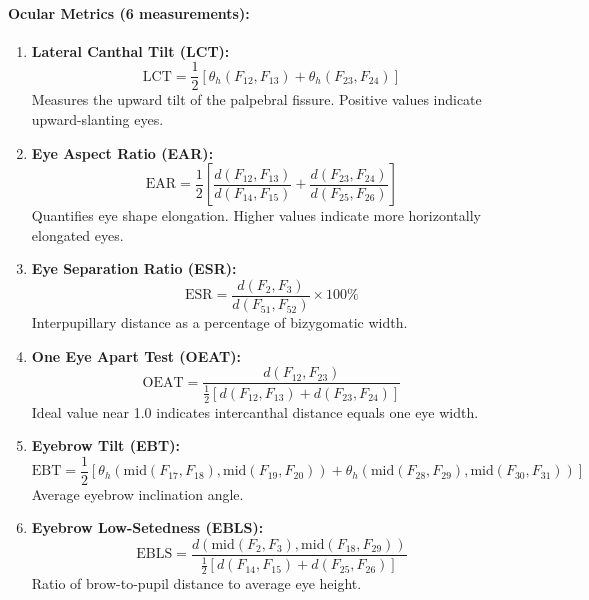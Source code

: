 \paragraph{Ocular Metrics (6 measurements):}
\begin{enumerate}
    \item \textbf{Lateral Canthal Tilt (LCT):}
    \begin{equation}
    \text{LCT} = \frac{1}{2}\left[\theta_h(F_{12}, F_{13}) + \theta_h(F_{23}, F_{24})\right]
    \end{equation}
    Measures the upward tilt of the palpebral fissure. Positive values indicate upward-slanting eyes.
    
    \item \textbf{Eye Aspect Ratio (EAR):}
    \begin{equation}
    \text{EAR} = \frac{1}{2}\left[\frac{d(F_{12}, F_{13})}{d(F_{14}, F_{15})} + \frac{d(F_{23}, F_{24})}{d(F_{25}, F_{26})}\right]
    \end{equation}
    Quantifies eye shape elongation. Higher values indicate more horizontally elongated eyes.
    
    \item \textbf{Eye Separation Ratio (ESR):}
    \begin{equation}
    \text{ESR} = \frac{d(F_2, F_3)}{d(F_{51}, F_{52})} \times 100\%
    \end{equation}
    Interpupillary distance as a percentage of bizygomatic width.
    
    \item \textbf{One Eye Apart Test (OEAT):}
    \begin{equation}
    \text{OEAT} = \frac{d(F_{12}, F_{23})}{\frac{1}{2}[d(F_{12}, F_{13}) + d(F_{23}, F_{24})]}
    \end{equation}
    Ideal value near 1.0 indicates intercanthal distance equals one eye width.
    
    \item \textbf{Eyebrow Tilt (EBT):}
    \begin{equation}
    \text{EBT} = \frac{1}{2}\left[\theta_h\left(\text{mid}(F_{17}, F_{18}), \text{mid}(F_{19}, F_{20})\right) + \theta_h\left(\text{mid}(F_{28}, F_{29}), \text{mid}(F_{30}, F_{31})\right)\right]
    \end{equation}
    Average eyebrow inclination angle.
    
    \item \textbf{Eyebrow Low-Setedness (EBLS):}
    \begin{equation}
    \text{EBLS} = \frac{d\left(\text{mid}(F_2, F_3), \text{mid}(F_{18}, F_{29})\right)}{\frac{1}{2}[d(F_{14}, F_{15}) + d(F_{25}, F_{26})]}
    \end{equation}
    Ratio of brow-to-pupil distance to average eye height.
\end{enumerate}

